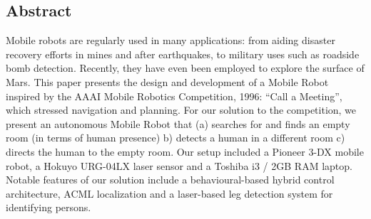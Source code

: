 \documentclass{article}
\begin{document}
\begin{multicols}{2}
    \section{Abstract}
		Mobile robots are regularly used in many applications: from aiding disaster recovery efforts in mines and after earthquakes, to military uses such as roadside bomb detection. Recently, they have even been employed to explore the surface of Mars. This paper presents the design and development of a Mobile Robot inspired by the AAAI Mobile Robotics Competition, 1996: “Call a Meeting”, which stressed navigation and planning.  For our solution to the competition, we present an autonomous Mobile Robot that (a) searches for and finds an empty room (in terms of human presence) b) detects a human in a different room c) directs the human to the empty room. Our setup included a Pioneer 3-DX mobile robot, a Hokuyo URG-04LX laser sensor and a Toshiba i3 / 2GB RAM laptop. Notable features of our solution include a behavioural-based hybrid control architecture, ACML localization and a laser-based leg detection system for identifying persons.
		\end{multicols}
\end{document}
